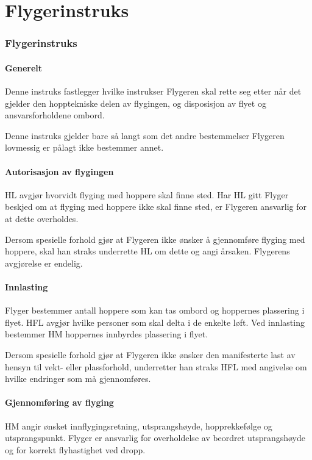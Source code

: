 \part{Flygerinstruks}
\setcounter{section}{508}

\section{Flygerinstruks}
\subsection{Generelt}
Denne instruks fastlegger hvilke instrukser Flygeren skal rette seg etter når det gjelder den hopptekniske delen av flygingen, og disposisjon av flyet og ansvarsforholdene ombord.

Denne instruks gjelder bare så langt som det andre bestemmelser Flygeren lovmessig er pålagt ikke bestemmer annet.

\subsection{Autorisasjon av flygingen}
HL avgjør hvorvidt flyging med hoppere skal finne sted. Har HL gitt Flyger beskjed om at flyging med hoppere ikke skal finne sted, er Flygeren ansvarlig for at dette overholdes.

Dersom spesielle forhold gjør at Flygeren ikke ønsker å gjennomføre flyging med hoppere, skal han straks underrette HL om dette og angi årsaken. Flygerens avgjørelse er endelig.

\subsection{Innlasting}
Flyger bestemmer antall hoppere som kan tas ombord og hoppernes plassering i flyet. HFL avgjør hvilke personer som skal delta i de enkelte løft. Ved innlasting bestemmer HM hoppernes innbyrdes plassering i flyet.

Dersom spesielle forhold gjør at Flygeren ikke ønsker den manifesterte last av hensyn til vekt- eller plassforhold, underretter han straks HFL med angivelse om hvilke endringer som må gjennomføres.

\subsection{Gjennomføring av flyging}
HM angir ønsket innflygingsretning, utsprangshøyde, hopprekkefølge og utsprangspunkt. Flyger er ansvarlig for overholdelse av beordret utsprangshøyde og for korrekt flyhastighet ved dropp.

